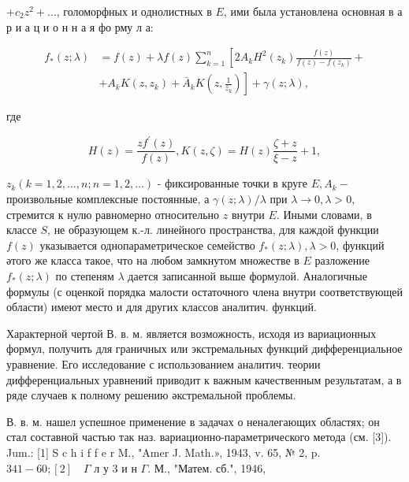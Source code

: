 \documentclass[10pt]{article}
\begin{document}
$+c_{2} z^{2}+\ldots$, голоморфных и однолистных в $E$, ими была установлена основная в а р и а ц и о н н а я фо рму л а:



\[

\begin{aligned}

f_{*}(z ; \lambda) & =f(z)+\lambda f(z) \sum_{k=1}^{n}\left[2 A_{k} H^{2}\left(z_{k}\right) \frac{f(z)}{f(z)-f\left(z_{k}\right)}+\right. \\

& \left.+A_{k} K\left(z, z_{k}\right)+\bar{A}_{k} K\left(z, \frac{1}{\bar{z}_{k}}\right)\right]+\gamma(z ; \lambda),

\end{aligned}

\]



где



\[

H(z)=\frac{z f^{\prime}(z)}{f(z)}, K(z, \zeta)=H(z) \frac{\zeta+z}{\xi-z}+1,

\]



$z_{k}(k=1,2, \ldots, n ; n=1,2, \ldots)$ - фиксированные точки в круге $E, A_{k}-$ произвольные комплексные постоянные, а $\gamma(z ; \lambda) / \lambda$ при $\lambda \rightarrow 0, \lambda>0$, стремится к нулю равномерно относительно $z$ внутри $E$. Иными словами, в классе $S$, не образующем к.-л. линейного пространства, для каждой функции $f(z)$ указывается однопараметрическое семейство $f_{*}(z ; \lambda), \lambda>0$, функций әтого же класса такое, что на любом замкнутом множестве в $E$ разложение $f_{*}(z ; \lambda)$ по степеням $\lambda$ дается записанной выше формулой. Аналогичные формулы (с оценкой порядка малости остаточного члена внутри соответствующей области) имеют место и для других классов аналитич. функций.



Характерной чертой В. в. м. является возможность, исходя из вариационных формул, получить для граничных или экстремальных функций дифференциальное уравнение. Его исследование с использованием аналитич. теории дифференциальных уравнений приводит к важным качественным результатам, а в ряде случаев к полному решению әкстремальной проблемы.



В. в. м. нашел успешное применение в задачах о неналегающих областях; он стал составной частью так наз. вариационно-параметрического метода (см. [3]). Jum.: [1] S c h i f f e r M., "Amer J. Math.», 1943, v. 65, № 2, p. $341-60 ;[2] \quad \Gamma$ л у 3 и н $\Gamma$. М., "Матем. сб.", 1946,
\end{document}
